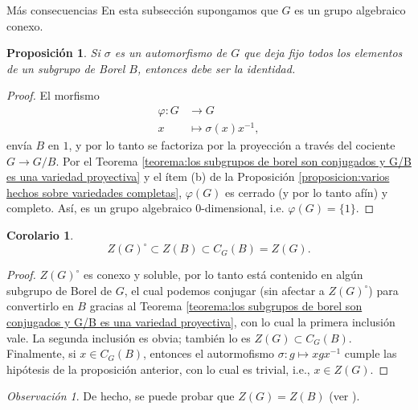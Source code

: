 \documentclass[spanish,10pt]{amsart}
\makeatletter
\renewcommand\subsection{\@startsection{subsection}{2}%
  \z@{.5\linespacing\@plus.7\linespacing}{-.5em}%
  {\normalfont\sffamily}}
\newtheorem{corollary}[theorem]{Corolario}
\newtheorem{proposition}[theorem]{Proposición}
\theoremstyle{definition}
\theoremstyle{remark}
\newtheorem{remark}[theorem]{Observación}
\numberwithin{equation}{section}
\makeatother
\begin{document}
\subsection{Más consecuencias}
En esta subsección supongamos que $G$ es un grupo algebraico conexo.


\begin{proposition}
Si $\sigma$ es un automorfismo de $G$ que deja fijo todos los elementos de un subgrupo de Borel $B$, entonces debe ser la identidad.
\end{proposition}
\begin{proof}
El morfismo
\begin{align*}
\varphi : G &\longrightarrow G \\
x &\longmapsto \sigma(x)x^{-1},
\end{align*}
envía $B$ en $1$, y por lo tanto se factoriza por la proyección a través del cociente $G \to G/B$. Por el Teorema \ref{teorema:los subgrupos de borel son conjugados y G/B es una variedad proyectiva} y el ítem (b) de la Proposición \ref{proposicion:varios hechos sobre variedades completas}, $\varphi (G)$ es cerrado (y por lo tanto afín) y completo. Así, es un grupo algebraico $0$-dimensional, i.e. $\varphi (G) = \{1\}$.
\end{proof}

\begin{corollary}
\[
    Z(G)^{\circ} \subset Z(B) \subset C_G (B) = Z(G).
\]
\end{corollary}
\begin{proof}
$Z(G)^\circ$ es conexo y soluble, por lo tanto está contenido en algún subgrupo de Borel de $G$, el cual podemos conjugar (sin afectar a $Z(G)^\circ$) para convertirlo en $B$ gracias al Teorema \ref{teorema:los subgrupos de borel son conjugados y G/B es una variedad proyectiva}, con lo cual la primera inclusión vale. La segunda inclusión es obvia; también lo es $Z(G) \subset C_G (B)$. Finalmente, si $x \in C_G (B)$, entonces el autormofismo $\sigma : g \mapsto x g x^{-1}$ cumple las hipótesis de la proposición anterior, con lo cual es trivial, i.e., $x \in Z(G)$.
\end{proof}

\begin{remark}
De hecho, se puede probar que $Z(G) = Z(B)$ (ver \cite[Corolario B \S 22.2]{humphreys2012linearAlgebraicGroups}).
\end{remark}
\end{document}
